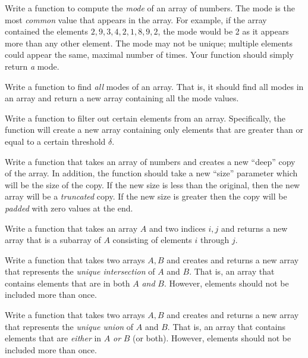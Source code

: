 \begin{exer}
Write a function to compute the \emph{mode} of an array of 
numbers.  The mode is the most \emph{common} value that 
appears in the array.  For example, if the array contained the 
elements $2, 9, 3, 4, 2, 1, 8, 9, 2$, the mode would be
2 as it appears more than any other element.  The mode may 
not be unique; multiple elements could appear the same, 
maximal number of times.  Your function should simply return 
\emph{a} mode.
\end{exer}

\begin{exer}
Write a function to find \emph{all} modes of an array.  That 
is, it should find all modes in an array and return a new array 
containing all the mode values.
\end{exer}

\begin{exer}
Write a function to filter out certain elements from an array.  
Specifically, the function will create a new array containing 
only elements that are greater than or equal to a certain 
threshold $\delta$.  
\end{exer}

\begin{exer}
Write a function that takes an array of numbers and 
creates a new ``deep'' copy of the array.  In addition, the
function should take a new ``size'' parameter which will
be the size of the copy.  If the new size is less than
the original, then the new array will be a \emph{truncated} 
copy.  If the new size is greater then the copy will be 
\emph{padded} with zero values at the end.
\end{exer}

\begin{exer}
Write a function that takes an array $A$ and two indices
$i, j$ and returns a new array that is a subarray of 
$A$ consisting of elements $i$ through $j$.
\end{exer}

\begin{exer}
Write a function that takes two arrays $A, B$ and creates
and returns a new array that represents the \emph{unique
intersection} of $A$ and $B$.  That is, an array that contains
elements that are in both $A$ \emph{and} $B$.  However, 
elements should not be included more than once.
\end{exer}

\begin{exer}
Write a function that takes two arrays $A, B$ and creates
and returns a new array that represents the \emph{unique
union} of $A$ and $B$.  That is, an array that contains
elements that are \emph{either} in $A$ \emph{or} $B$
(or both).  However, elements should not be included more than once.
\end{exer}

